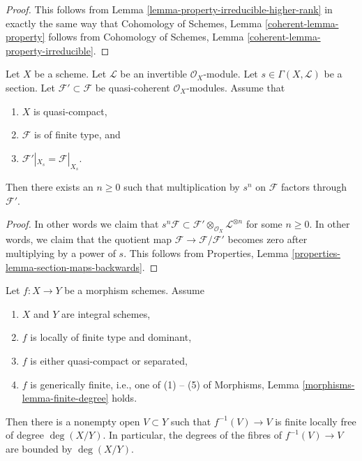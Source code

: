 \begin{proof}
This follows from Lemma \ref{lemma-property-irreducible-higher-rank}
in exactly the same way that
Cohomology of Schemes, Lemma \ref{coherent-lemma-property} follows from
Cohomology of Schemes, Lemma \ref{coherent-lemma-property-irreducible}.
\end{proof}

\begin{lemma}
\label{lemma-section-maps-back-into}
Let $X$ be a scheme.
Let $\mathcal{L}$ be an invertible $\mathcal{O}_X$-module.
Let $s \in \Gamma(X, \mathcal{L})$ be a section.
Let $\mathcal{F}' \subset \mathcal{F}$ be quasi-coherent
$\mathcal{O}_X$-modules. Assume that
\begin{enumerate}
\item $X$ is quasi-compact,
\item $\mathcal{F}$ is of finite type, and
\item $\mathcal{F}'|_{X_s} = \mathcal{F}|_{X_s}$.
\end{enumerate}
Then there exists an $n \geq 0$ such that
multiplication by $s^n$ on $\mathcal{F}$ factors
through $\mathcal{F}'$.
\end{lemma}

\begin{proof}
In other words we claim that
$s^n\mathcal{F} \subset
\mathcal{F}' \otimes_{\mathcal{O}_X} \mathcal{L}^{\otimes n}$
for some $n \geq 0$. In other words, we claim that the quotient map
$\mathcal{F} \to \mathcal{F}/\mathcal{F}'$ becomes
zero after multiplying by a power of $s$.
This follows from Properties, Lemma
\ref{properties-lemma-section-maps-backwards}.
\end{proof}

\begin{lemma}
\label{lemma-bound-degree-in-nbhd-generic-point}
Let $f : X \to Y$ be a morphism schemes. Assume
\begin{enumerate}
\item $X$ and $Y$ are integral schemes,
\item $f$ is locally of finite type and dominant,
\item $f$ is either quasi-compact or separated,
\item $f$ is generically finite, i.e., one of (1) -- (5) of
Morphisms, Lemma \ref{morphisms-lemma-finite-degree} holds.
\end{enumerate}
Then there is a nonempty open $V \subset Y$ such that
$f^{-1}(V) \to V$ is finite locally free of degree $\deg(X/Y)$.
In particular, the degrees of the fibres of $f^{-1}(V) \to V$
are bounded by $\deg(X/Y)$.
\end{lemma}


